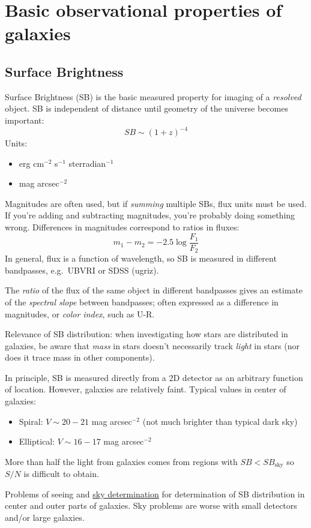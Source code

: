 \documentclass{article}
\begin{document}
\section{Basic observational properties of galaxies}
\subsection{Surface Brightness}
Surface Brightness (SB) is the basic measured property for imaging of
a \emph{resolved} object.
\textcolor{bred}{SB is independent of distance until geometry of the
universe becomes important:}
\[
    SB \sim (1+z)^{-4}
\]
Units:
\begin{itemize}
    \item erg cm$^{-2}$ s$^{-1}$ sterradian$^{-1}$
    \item mag arcsec$^{-2}$
\end{itemize}
Magnitudes are often used, but if \emph{summing} multiple SBs, flux units
must be used. If you're adding and subtracting magnitudes, you're probably
doing something wrong. \Smiley Differences in magnitudes correspond to
ratios in fluxes:
\[
    m_{1} - m_{2} = -2.5\log\frac{F_{1}}{F_{2}}
\]
In general, flux is a function of wavelength, so SB is measured in
different bandpasses, e.g.\ UBVRI or SDSS (ugriz).

The \emph{ratio} of the flux of the same object in different bandpasses
gives an estimate of the \emph{spectral slope} between bandpasses;
often expressed as a difference in magnitudes, or
\emph{color index}, such as U-R.

Relevance of SB distribution: when investigating how stars are distributed in
galaxies, be aware that \emph{mass} in stars doesn't necessarily track
\emph{light} in stars (nor does it trace mass in other components).

In principle, SB is measured directly from a 2D detector as an
arbitrary function of location. However,
galaxies are relatively faint. Typical values in center of galaxies:
\begin{itemize}
    \item Spiral: $V \sim 20 - 21$ mag arcsec$^{-2}$
        (not much brighter than typical dark sky)
    \item Elliptical: $V \sim 16 - 17$ mag arcsec$^{-2}$
\end{itemize}
More than half the light from galaxies comes from regions with
$SB < SB_{\mathrm{sky}}$ so $S/N$ is difficult to obtain.

Problems of seeing and \href{http://astronomy.nmsu.edu/holtz/a555/html/diagrams/a616/sky.htm}
{sky determination} for determination of SB distribution in center and
outer parts of galaxies. Sky problems are worse with small detectors and/or
large galaxies.
\end{document}
